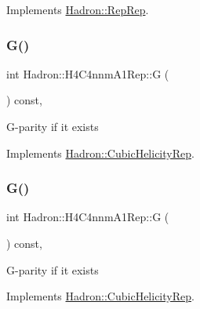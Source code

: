 Implements \mbox{\hyperlink{structHadron_1_1RepRep_a92c8802e5ed7afd7da43ccfd5b7cd92b}{Hadron\+::\+Rep\+Rep}}.

\mbox{\label{structHadron_1_1H4C4nnmA1Rep_a300704aab920eec248013b3e0ca1f53a}} 
\subsubsection{\texorpdfstring{G()}{G()}\hspace{0.1cm}{\footnotesize\ttfamily [1/3]}}
{\footnotesize\ttfamily int Hadron\+::\+H4\+C4nnm\+A1\+Rep\+::G (\begin{DoxyParamCaption}{ }\end{DoxyParamCaption}) const\hspace{0.3cm}{\ttfamily [inline]}, {\ttfamily [virtual]}}

G-\/parity if it exists 

Implements \mbox{\hyperlink{structHadron_1_1CubicHelicityRep_a50689f42be1e6170aa8cf6ad0597018b}{Hadron\+::\+Cubic\+Helicity\+Rep}}.

\mbox{\label{structHadron_1_1H4C4nnmA1Rep_a300704aab920eec248013b3e0ca1f53a}} 
\subsubsection{\texorpdfstring{G()}{G()}\hspace{0.1cm}{\footnotesize\ttfamily [2/3]}}
{\footnotesize\ttfamily int Hadron\+::\+H4\+C4nnm\+A1\+Rep\+::G (\begin{DoxyParamCaption}{ }\end{DoxyParamCaption}) const\hspace{0.3cm}{\ttfamily [inline]}, {\ttfamily [virtual]}}

G-\/parity if it exists 

Implements \mbox{\hyperlink{structHadron_1_1CubicHelicityRep_a50689f42be1e6170aa8cf6ad0597018b}{Hadron\+::\+Cubic\+Helicity\+Rep}}.

\mbox{\label{structHadron_1_1H4C4nnmA1Rep_a300704aab920eec248013b3e0ca1f53a}} 

